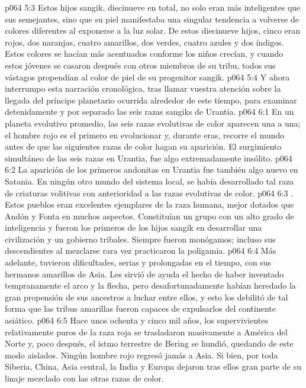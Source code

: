\vs p064 5:3 Estos hijos sangik, diecinueve en total, no solo eran más inteligentes que sus semejantes, sino que su piel manifestaba una singular tendencia a volverse de colores diferentes al exponerse a la luz solar. De estos diecinueve hijos, cinco eran rojos, dos naranjas, cuatro amarillos, dos verdes, cuatro azules y dos índigos. Estos colores se hacían más acentuados conforme los niños crecían, y cuando estos jóvenes se casaron después con otros miembros de su tribu, todos sus vástagos propendían al color de piel de su progenitor sangik.
\vs p064 5:4 Y ahora interrumpo esta narración cronológica, tras llamar vuestra atención sobre la llegada del príncipe planetario ocurrida alrededor de este tiempo, para examinar detenidamente y por separado las seis razas sangiks de Urantia.
\vs p064 6:1 En un planeta evolutivo promedio, las seis razas evolutivas de color aparecen una a una; el hombre rojo es el primero en evolucionar y, durante eras, recorre el mundo antes de que las siguientes razas de color hagan su aparición. El surgimiento simultáneo de las seis razas en Urantia,  fue algo extremadamente insólito.
\vs p064 6:2 La aparición de los primeros andonitas en Urantia fue también algo nuevo en Satania. En ningún otro mundo del sistema local, se había desarrollado tal raza de criaturas volitivas con anterioridad a las razas evolutivas de color.
\vs p064 6:3 . Estos pueblos eran excelentes ejemplares de la raza humana, mejor dotados que Andón y Fonta en muchos aspectos. Constituían un grupo con un alto grado de inteligencia y fueron los primeros de los hijos sangik en desarrollar una civilización y un gobierno tribales. Siempre fueron monógamos; incluso sus descendientes al mezclarse rara vez practicaron la poligamia.
\vs p064 6:4 Más adelante, tuvieron dificultades, serias y prolongadas en el tiempo, con sus hermanos amarillos de Asia. Les sirvió de ayuda el hecho de haber inventado tempranamente el arco y la flecha, pero desafortunadamente habían heredado la gran propensión de sus ancestros a luchar entre ellos, y esto los debilitó de tal forma que las tribus amarillas fueron capaces de expulsarlos del continente asiático.
\vs p064 6:5 Hace unos ochenta y cinco mil años, los supervivientes relativamente puros de la raza roja se trasladaron masivamente a América del Norte y, poco después, el istmo terrestre de Bering se hundió, quedando de este modo aislados. Ningún hombre rojo regresó jamás a Asia. Si bien, por toda Siberia, China, Asia central, la India y Europa dejaron tras ellos gran parte de su linaje mezclado con las otras razas de color.
